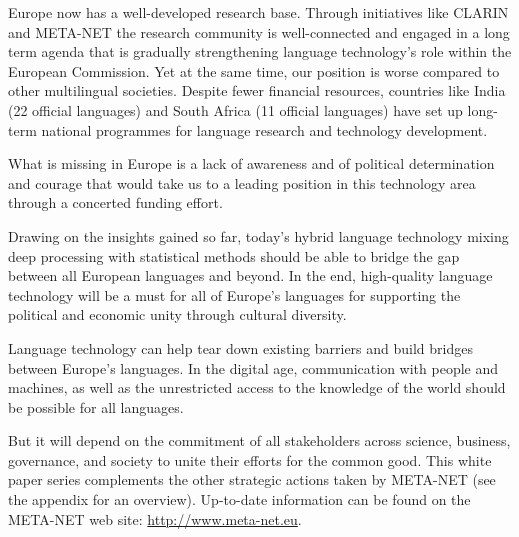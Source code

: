 \begin{multicols}{2}
Europe now has a well-developed research base. Through initiatives like CLARIN and META-NET the research community is well-connected and engaged in a long term agenda that is gradually strengthening language technology's role within the European Commission. Yet at the same time, our position is worse compared to other multilingual societies. Despite fewer financial resources, countries like India (22 official languages) and South Africa (11 official languages) have set up long-term national programmes for language research and technology development.

What is missing in Europe is a lack of awareness and of political determination and courage that would take us to a leading position in this technology area through a concerted funding effort.

Drawing on the insights gained so far, today’s hybrid language technology mixing deep processing with statistical methods should be able to bridge the gap between all European languages and beyond. In the end, high-quality language technology will be a must for all of Europe's languages for supporting the political and economic unity through cultural diversity.

Language technology can help tear down existing barriers and build bridges between Europe’s languages. In the digital age, communication with people and machines, as well as the unrestricted access to the knowledge of the world should be possible for all languages.

But it will depend on the commitment of all stakeholders across science, business, governance, and society to unite their efforts for the common good.  This white paper series complements the other strategic actions taken by META-NET (see the appendix for an overview). Up-to-date information can be found on the META-NET web site: \url{http://www.meta-net.eu}.
\end{multicols}

\clearpage


